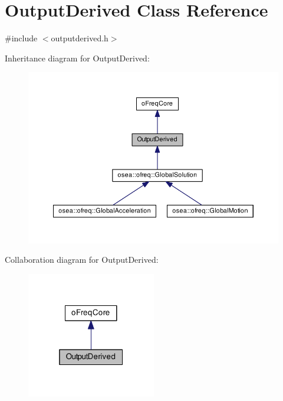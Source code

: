\hypertarget{class_output_derived}{\section{Output\-Derived Class Reference}
\label{class_output_derived}
}


{\ttfamily \#include $<$outputderived.\-h$>$}



Inheritance diagram for Output\-Derived\-:
\nopagebreak
\begin{figure}[H]
\begin{center}
\leavevmode
\includegraphics[width=350pt]{class_output_derived__inherit__graph}
\end{center}
\end{figure}


Collaboration diagram for Output\-Derived\-:\nopagebreak
\begin{figure}[H]
\begin{center}
\leavevmode
\includegraphics[width=160pt]{class_output_derived__coll__graph}
\end{center}
\end{figure}
